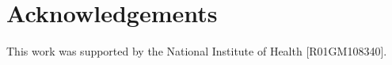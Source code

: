 \section{Acknowledgements}
This work was supported by the National Institute of Health [R01GM108340].